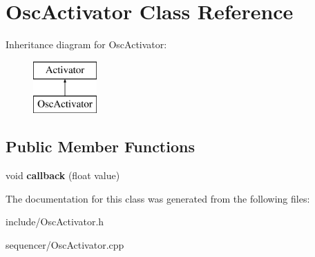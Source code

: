 \hypertarget{classOscActivator}{}\section{Osc\+Activator Class Reference}
\label{classOscActivator}
Inheritance diagram for Osc\+Activator\+:\begin{figure}[H]
\begin{center}
\leavevmode
\includegraphics[height=2.000000cm]{classOscActivator}
\end{center}
\end{figure}
\subsection*{Public Member Functions}
\begin{DoxyCompactItemize}
\item 
void {\bfseries callback} (float value)\hypertarget{classOscActivator_ad5852376e949408b2fc13c8adf60c032}{}\label{classOscActivator_ad5852376e949408b2fc13c8adf60c032}

\end{DoxyCompactItemize}


The documentation for this class was generated from the following files\+:\begin{DoxyCompactItemize}
\item 
include/Osc\+Activator.\+h\item 
sequencer/Osc\+Activator.\+cpp\end{DoxyCompactItemize}
